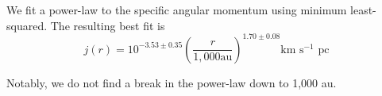We fit a power-law to the specific angular momentum using minimum least-squared. 
The resulting best fit is 
\begin{equation}
j(r) = 10^{-3.53\pm 0.35}\left( \frac{r}{1,000 \textrm{au}}\right)^{1.70\pm0.08} \textrm{km s$^{-1}$ pc}
\end{equation}

Notably, we do not find a break in the power-law down to 1,000 au.